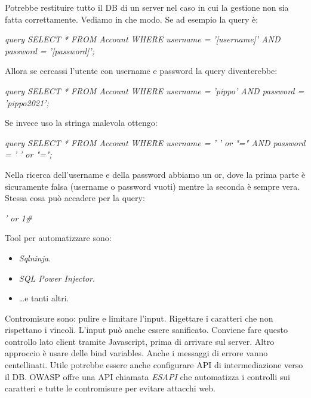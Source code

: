 \documentclass[14pt]{extreport}
\begin{document}
Potrebbe restituire tutto il DB di un server nel caso in cui la gestione non sia fatta correttamente. Vediamo in che modo. Se ad esempio la query è:

\begin{center}
    \textit{query SELECT * FROM Account WHERE username = '[username]' AND password = '[password]';}
\end{center}

Allora se cercassi l'utente con username  e password  la query diventerebbe:

\begin{center}
    \textit{query SELECT * FROM Account WHERE username = 'pippo' AND password = 'pippo2021';}
\end{center}

Se invece uso la stringa malevola ottengo:


\begin{center}
    \textit{query SELECT * FROM Account WHERE username = ' ' or "=" AND password = ' ' or "=";}
\end{center}
Nella ricerca dell'username e della password abbiamo un or, dove la prima parte è sicuramente falsa (username o password vuoti) mentre la seconda è sempre vera.
Stessa cosa può accadere per la query:

\begin{center}
    \textit{' or 1\#}
\end{center}

Tool per automatizzare sono:

\begin{itemize}
    \item \textit{Sqlninja}.
    
    \item \textit{SQL Power Injector}.
    
    \item \ldots e tanti altri.
\end{itemize}
Contromisure sono: pulire e limitare l'input. Rigettare i caratteri che non rispettano i vincoli. L'input può anche essere sanificato. Conviene fare questo controllo lato client tramite Javascript, prima di arrivare sul server. Altro approccio è usare delle bind variables. Anche i messaggi di errore vanno centellinati. Utile potrebbe essere anche configurare API di intermediazione verso il DB.
OWASP offre una API chiamata \textit{ESAPI} che automatizza i controlli sui caratteri e tutte le contromisure per evitare attacchi web. 
\end{document}

